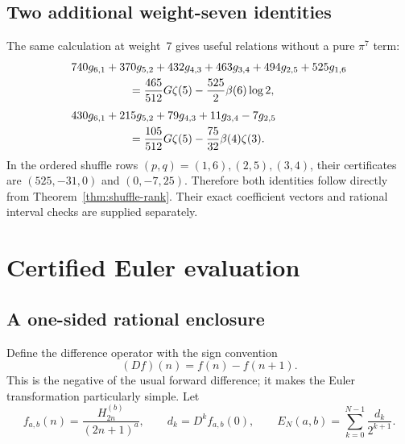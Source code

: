 \documentclass[11pt,a4paper]{article}
\numberwithin{equation}{section}
\theoremstyle{definition}
\theoremstyle{remark}
\begin{document}
\subsection{Two additional weight-seven identities}
The same calculation at weight~7 gives useful relations without a pure $\pi^7$ term:
\begin{align}
 &740g_{6,1}+370g_{5,2}+432g_{4,3}
       +463g_{3,4}+494g_{2,5}+525g_{1,6}\notag\\
 &\hspace{18mm}=\frac{465}{512}G\zeta(5)
                 -\frac{525}{2}\beta(6)\log2,\label{eq:w7-first}\\[3pt]
 &430g_{6,1}+215g_{5,2}+79g_{4,3}+11g_{3,4}-7g_{2,5}\notag\\
 &\hspace{18mm}=\frac{105}{512}G\zeta(5)
                 -\frac{75}{32}\beta(4)\zeta(3).\label{eq:w7-second}
\end{align}
In the ordered shuffle rows $(p,q)=(1,6),(2,5),(3,4)$, their certificates are $(525,-31,0)$ and $(0,-7,25)$. Therefore both identities follow directly from Theorem~\ref{thm:shuffle-rank}. Their exact coefficient vectors and rational interval checks are supplied separately.

\section{Certified Euler evaluation}
\label{sec:euler}

\subsection{A one-sided rational enclosure}
Define the difference operator with the sign convention
\[
 (Df)(n)=f(n)-f(n+1).
\]
This is the negative of the usual forward difference; it makes the Euler transformation particularly simple. Let
\begin{equation}\label{eq:euler-data}
 f_{a,b}(n)=\frac{H_{2n}^{(b)}}{(2n+1)^a},\qquad
 d_k=D^kf_{a,b}(0),\qquad
 E_N(a,b)=\sum_{k=0}^{N-1}\frac{d_k}{2^{k+1}}.
\end{equation}
\end{document}
